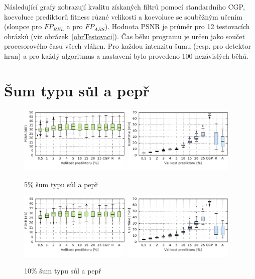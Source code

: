 Následující grafy zobrazují kvalitu získaných filtrů pomocí standardního CGP, koevoluce prediktorů fitness různé velikosti a koevoluce se souběžným učením (sloupce  pro $\mathit{FP_{REL}}$ a  pro $\mathit{FP_{ABS}}$). Hodnota PSNR je průměr pro 12 testovacích obrázků (viz obrázek~\ref{obrTestovaci}). Čas běhu programu je určen jako součet procesorového času všech vláken. Pro každou intenzitu šumu (resp. pro detektor hran) a pro každý algoritmus a nastavení bylo provedeno 100 nezávislých běhů.

\section{Šum typu sůl a pepř}

\begin{figure}[H]
    \centering
    \includegraphics[width=0.475\textwidth]{fig/plot/compare/saltpepper5-100kg-psnrtest.pdf}
    \hskip0.5cm
    \includegraphics[width=0.475\textwidth]{fig/plot/compare/saltpepper5-100kg-usertime.pdf}
    \caption{5\% šum typu sůl a pepř}
\end{figure}

\begin{figure}[H]
    \centering
    \includegraphics[width=0.475\textwidth]{fig/plot/compare/saltpepper10-100kg-psnrtest.pdf}
    \hskip0.5cm
    \includegraphics[width=0.475\textwidth]{fig/plot/compare/saltpepper10-100kg-usertime.pdf}
    \caption{10\% šum typu sůl a pepř}
\end{figure}

